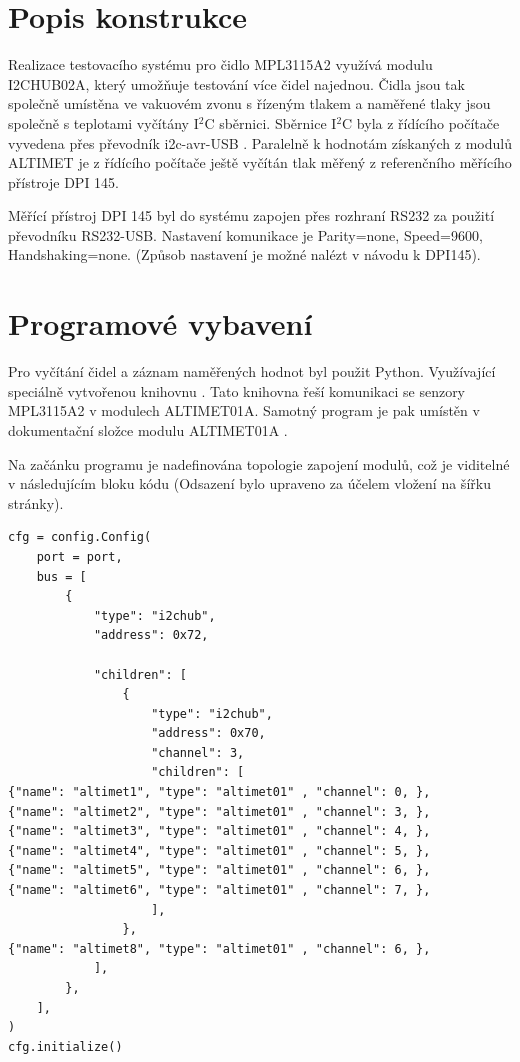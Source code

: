 \documentclass[12pt,a4paper,oneside]{article}
\begin{document}
\newpage
\tableofcontents
\newpage

\section{Popis konstrukce}

Realizace testovacího systému pro čidlo MPL3115A2 využívá modulu I2CHUB02A, který umožňuje testování více čidel najednou. Čidla jsou tak společně umístěna ve vakuovém zvonu s řízeným tlakem a naměřené tlaky jsou společně s teplotami vyčítány I$^2$C sběrnici. Sběrnice I$^2$C byla z řídícího počítače vyvedena přes převodník i2c-avr-USB \cite{i2c-avr-USB}. 
Paralelně k hodnotám získaných z modulů ALTIMET je z řídícího počítače ještě vyčítán tlak měřený z referenčního měřícího přístroje DPI 145. 

Měřící přístroj DPI 145 byl do systému zapojen přes rozhraní RS232 za použití převodníku  RS232-USB. Nastavení komunikace je Parity=none, Speed=9600, Handshaking=none. (Způsob nastavení je možné nalézt v návodu k DPI145). 

\section{Programové vybavení}

Pro vyčítání čidel a záznam naměřených hodnot byl použit Python. Využívající speciálně vytvořenou knihovnu  \cite{MLAB-I2c-modules}. Tato knihovna řeší komunikaci se senzory MPL3115A2 v modulech ALTIMET01A. Samotný program je pak umístěn v dokumentační složce modulu ALTIMET01A \cite{data_logger}.

Na začánku programu je nadefinována topologie zapojení modulů, což je viditelné v následujícím bloku kódu (Odsazení bylo upraveno za účelem vložení na šířku stránky).

\lstset{language=Python}
\begin{lstlisting}[frame=single]
cfg = config.Config(
    port = port,
    bus = [
        {
            "type": "i2chub",
            "address": 0x72,
            
            "children": [
                {
                    "type": "i2chub",
                    "address": 0x70,
                    "channel": 3,
                    "children": [
{"name": "altimet1", "type": "altimet01" , "channel": 0, },   
{"name": "altimet2", "type": "altimet01" , "channel": 3, },   
{"name": "altimet3", "type": "altimet01" , "channel": 4, },   
{"name": "altimet4", "type": "altimet01" , "channel": 5, },   
{"name": "altimet5", "type": "altimet01" , "channel": 6, },   
{"name": "altimet6", "type": "altimet01" , "channel": 7, },   
                    ], 
                },
{"name": "altimet8", "type": "altimet01" , "channel": 6, },
            ],
        },
    ],
)
cfg.initialize()
\end{lstlisting}
\end{document}
